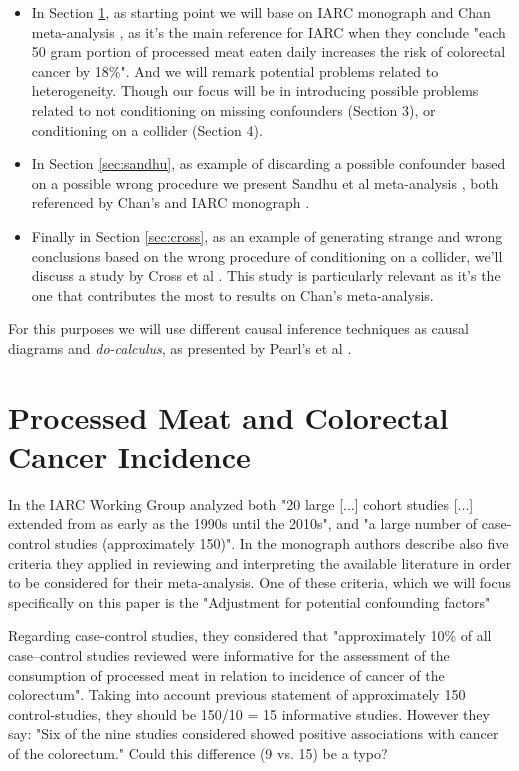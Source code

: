 \documentclass{article}
\begin{document}
\begin{itemize}

\item  In Section \ref{sec:iarc}, as starting point we will base on IARC monograph and Chan meta-analysis \cite{chan}, as it's the main reference for IARC when they conclude "each 50 gram portion of processed meat eaten daily increases the risk of colorectal cancer by 18\%". And we will remark potential problems related to heterogeneity. Though our focus will be in introducing possible problems related to not conditioning on missing confounders (Section 3), or conditioning on a collider (Section 4).
\item In Section \ref{sec:sandhu}, as example of discarding a possible confounder based on a possible wrong procedure we present Sandhu et al meta-analysis \cite{sandhu}, both referenced by Chan's \cite{chan} and IARC monograph \cite{monograph}.
\item Finally in Section \ref{sec:cross}, as an example of generating strange and wrong conclusions based on the wrong procedure of conditioning on a collider, we'll discuss a study by Cross et al \cite{cross}. This study is particularly relevant as it's the one that contributes the most to results on Chan's meta-analysis.
\end{itemize}

For this purposes we will use different causal inference techniques as causal diagrams and \textit{do-calculus}, as presented by Pearl's et al \cite{bookofwhy}.

\section{Processed Meat and Colorectal Cancer Incidence}
\label{sec:iarc}

In \cite{monograph} the IARC Working Group analyzed both "20 large [...] cohort studies [...] extended from as early as the 1990s until the 2010s", and "a large number of case-control studies (approximately 150)". In the monograph authors describe also five criteria they applied in reviewing and interpreting the available literature in order to be considered for their meta-analysis. One of these criteria, which we will focus specifically on this paper is the "Adjustment for potential confounding factors"

Regarding case-control studies, they considered that "approximately 10\% of all case–control studies reviewed were informative for the assessment of the consumption of processed meat in relation to incidence of cancer of the colorectum". Taking into account previous statement of approximately 150 control-studies, they should be 150/10 = 15 informative studies. However they say: "Six of the nine studies considered showed positive associations with cancer of the colorectum." Could this difference (9 vs. 15) be a typo?
\end{document}
